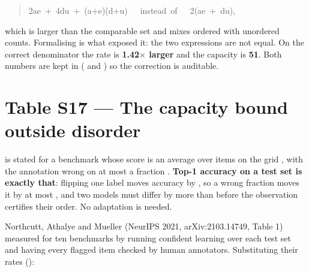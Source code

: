 \begin{quote}\ttfamily\footnotesize\begin{flushleft}
2ae~+~4du~+~(a+e)(d+u)~~~instead~of~~~2(ae~+~du),\\
\end{flushleft}\end{quote}

which is larger than the comparable set and mixes ordered with unordered counts.
Formalising  is what exposed it: the two expressions are
not equal. On the correct denominator the rate is \textbf{1.42$\times$ larger} and the
capacity is \textbf{51}. Both numbers are kept in 
( and ) so the correction is auditable.


\section*{Table S17 --- The capacity bound outside disorder}

 is stated for a benchmark whose score is an average over
 items on the grid , with the annotation wrong on at most a fraction .
\textbf{Top-1 accuracy on a test set is exactly that}: flipping one label moves
accuracy by , so a wrong fraction  moves it by at most , and two
models must differ by more than  before the observation certifies their
order. No adaptation is needed.

Northcutt, Athalye and Mueller (NeurIPS 2021, arXiv:2103.14749, Table 1)
measured  for ten benchmarks by running confident learning over each test set
and having every flagged item checked by human annotators. Substituting their
rates ():

